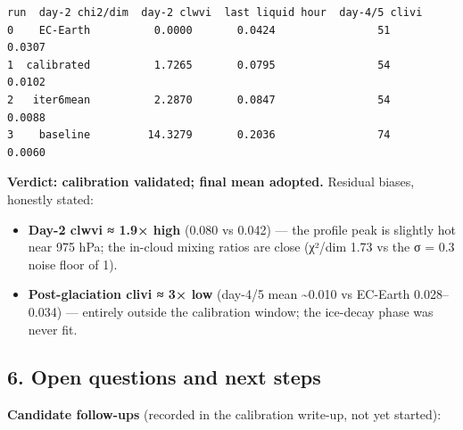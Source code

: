 \documentclass[11pt]{article}
\makeatletter
\providecommand{\tightlist}{%
      \setlength{\itemsep}{0pt}\setlength{\parskip}{0pt}}
\newcommand{\boxspacing}{\kern\kvtcb@left@rule\kern\kvtcb@boxsep}
\newcommand{\prompt}[4]{
        {\ttfamily\llap{{\color{#2}[#3]:\hspace{3pt}#4}}\vspace{-\baselineskip}}
    }
\makeatother
\begin{document}
            \begin{tcolorbox}[breakable, size=fbox, boxrule=.5pt, pad at break*=1mm, opacityfill=0]
\prompt{Out}{outcolor}{15}{\boxspacing}
\begin{Verbatim}[commandchars=\\\{\}]
          run  day-2 chi2/dim  day-2 clwvi  last liquid hour  day-4/5 clivi
0    EC-Earth          0.0000       0.0424                51         0.0307
1  calibrated          1.7265       0.0795                54         0.0102
2   iter6mean          2.2870       0.0847                54         0.0088
3    baseline         14.3279       0.2036                74         0.0060
\end{Verbatim}
\end{tcolorbox}
        
    \textbf{Verdict: calibration validated; final mean adopted.} Residual
biases, honestly stated:

\begin{itemize}
\tightlist
\item
  \textbf{Day-2 clwvi ≈ 1.9× high} (0.080 vs 0.042) --- the profile peak
  is slightly hot near 975 hPa; the in-cloud mixing ratios are close
  (χ²/dim 1.73 vs the σ = 0.3 noise floor of 1).
\item
  \textbf{Post-glaciation clivi ≈ 3× low} (day-4/5 mean
  \textasciitilde0.010 vs EC-Earth 0.028--0.034) --- entirely outside
  the calibration window; the ice-decay phase was never fit.
\end{itemize}

    \subsection{6. Open questions and next
steps}\label{open-questions-and-next-steps}

\textbf{Candidate follow-ups} (recorded in the calibration write-up, not
yet started):
\end{document}
